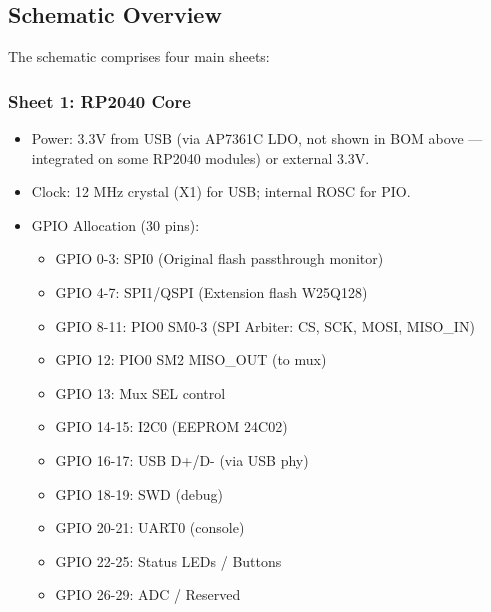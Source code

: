 \subsection{Schematic Overview}
The schematic comprises four main sheets:

\subsubsection{Sheet 1: RP2040 Core}
\begin{itemize}
    \item Power: 3.3V from USB (via AP7361C LDO, not shown in BOM above --- integrated on some RP2040 modules) or external 3.3V.
    \item Clock: 12 MHz crystal (X1) for USB; internal ROSC for PIO.
    \item GPIO Allocation (30 pins):
    \begin{itemize}
        \item GPIO 0-3: SPI0 (Original flash passthrough monitor)
        \item GPIO 4-7: SPI1/QSPI (Extension flash W25Q128)
        \item GPIO 8-11: PIO0 SM0-3 (SPI Arbiter: CS, SCK, MOSI, MISO\_IN)
        \item GPIO 12: PIO0 SM2 MISO\_OUT (to mux)
        \item GPIO 13: Mux SEL control
        \item GPIO 14-15: I2C0 (EEPROM 24C02)
        \item GPIO 16-17: USB D+/D- (via USB phy)
        \item GPIO 18-19: SWD (debug)
        \item GPIO 20-21: UART0 (console)
        \item GPIO 22-25: Status LEDs / Buttons
        \item GPIO 26-29: ADC / Reserved
    \end{itemize}
\end{itemize}


